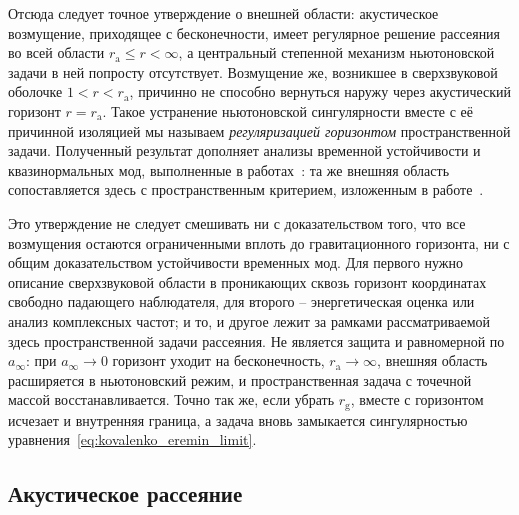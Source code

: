 \documentclass[12pt,a4paper,preprint,nopreprintline]{elsarticle}
\begin{document}
Отсюда следует точное утверждение о внешней области: акустическое возмущение, приходящее с бесконечности, имеет регулярное решение рассеяния во всей области $r_{\mathrm{a}}\le r<\infty$, а центральный степенной механизм ньютоновской задачи в ней попросту отсутствует. Возмущение же, возникшее в сверхзвуковой оболочке $1<r<r_{\mathrm{a}}$, причинно не способно вернуться наружу через акустический горизонт $r=r_{\mathrm{a}}$. Такое устранение ньютоновской сингулярности вместе с её причинной изоляцией мы называем \emph{регуляризацией горизонтом} пространственной задачи. Полученный результат дополняет анализы временной устойчивости и квазинормальных мод, выполненные в работах~\cite{MoncriefV_StabilityOfStationarySphericalAccretionOntoASchwarzschildBlackHole_1980,ChaverraE_MoralesMD_SarbachO_QuasinormalAcousticOscillationsInTheMichelFlow_2015}: та же внешняя область сопоставляется здесь с пространственным критерием, изложенным в работе~\cite{KovalenkoIG_EreminMA_SpatialInstabilityOfSphericalAccretion_1998}.

Это утверждение не следует смешивать ни с доказательством того, что все возмущения остаются ограниченными вплоть до гравитационного горизонта, ни с общим доказательством устойчивости временных мод. Для первого нужно описание сверхзвуковой области в проникающих сквозь горизонт координатах свободно падающего наблюдателя, для второго -- энергетическая оценка или анализ комплексных частот; и то, и другое лежит за рамками рассматриваемой здесь пространственной задачи рассеяния. Не является защита и равномерной по $a_{\infty}$: при $a_{\infty}\rightarrow0$ горизонт уходит на бесконечность, $r_{\mathrm{a}}\rightarrow\infty$, внешняя область расширяется в ньютоновский режим, и пространственная задача с точечной массой восстанавливается. Точно так же, если убрать $r_{\mathrm{g}}$, вместе с горизонтом исчезает и внутренняя граница, а задача вновь замыкается сингулярностью уравнения~\eqref{eq:kovalenko_eremin_limit}.

\subsection{Акустическое рассеяние}
\label{sec:acoustic_numerics}
\end{document}
